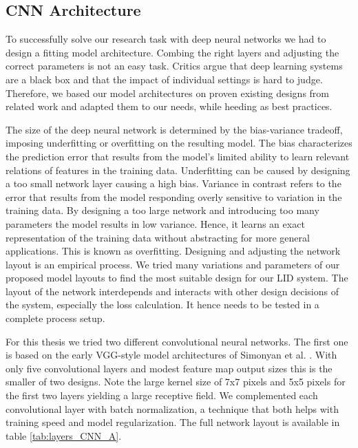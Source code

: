 \subsection{CNN Architecture}
\label{sec:cnn_architecture}
To successfully solve our research task with deep neural networks we had to design a fitting model architecture. Combing the right layers and adjusting the correct parameters is not an easy task. Critics argue that deep learning systems are a black box and that the impact of individual settings is hard to judge. Therefore, we based our model architectures on proven existing designs from related work and adapted them to our needs, while heeding as best practices\cite{szegedy2016rethinking}\cite{mishkin2016systematic}. 

The size of the deep neural network is determined by the bias-variance tradeoff\cite{geman1992neural}, imposing underfitting or overfitting on the resulting model. The bias characterizes the prediction error that results from the model's limited ability to learn relevant relations of features in the training data. Underfitting can be caused by designing a too small network layer causing a high bias. Variance in contrast refers to the error that results from the model responding overly sensitive to variation in the training data. By designing a too large network and introducing too many parameters the model results in low variance. Hence, it learns an exact representation of the training data without abstracting for more general applications. This is known as overfitting.
Designing and adjusting the network layout is an empirical process. We tried many variations and parameters of our proposed model layouts to find the most suitable design for our LID system. The layout of the network interdepends and interacts with other design decisions of the system, especially the loss calculation. It hence needs to be tested in a complete process setup. 

For this thesis we tried two different convolutional neural networks. The first one is based on the early VGG-style model architectures of Simonyan et al. \cite{Chatfield14}. With only five convolutional layers and modest feature map output sizes this is the smaller of two designs. Note the large kernel size of 7x7 pixels and 5x5 pixels for the first two layers yielding a large receptive field. We complemented each convolutional layer with batch normalization\cite{ioffe2015batch}, a technique that both helps with training speed and model regularization. The full network layout is available in table \ref{tab:layers_CNN_A}.

